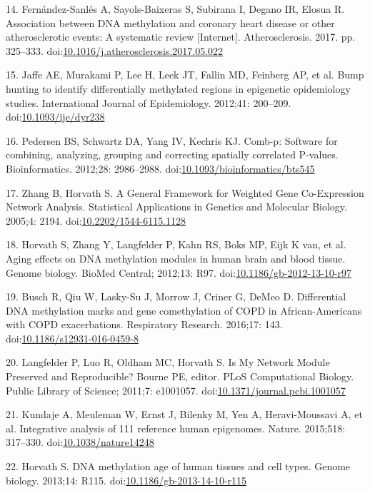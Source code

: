 \documentclass[]{article}
\theoremstyle{definition}
\theoremstyle{definition}
\theoremstyle{definition}
\theoremstyle{remark}
\begin{document}
14. Fern{á}ndez-Sanl{é}s A, Sayols-Baixeras S, Subirana I, Degano IR,
Elosua R. Association between DNA methylation and coronary heart disease
or other atherosclerotic events: A systematic review {[}Internet{]}.
Atherosclerosis. 2017. pp. 325--333.
doi:\href{http://dx.doi.org/10.1016/j.atherosclerosis.2017.05.022}{10.1016/j.atherosclerosis.2017.05.022}

15. Jaffe AE, Murakami P, Lee H, Leek JT, Fallin MD, Feinberg AP, et al.
Bump hunting to identify differentially methylated regions in epigenetic
epidemiology studies. International Journal of Epidemiology. 2012;41:
200--209.
doi:\href{http://dx.doi.org/10.1093/ije/dyr238}{10.1093/ije/dyr238}

16. Pedersen BS, Schwartz DA, Yang IV, Kechris KJ. Comb-p: Software for
combining, analyzing, grouping and correcting spatially correlated
P-values. Bioinformatics. 2012;28: 2986--2988.
doi:\href{http://dx.doi.org/10.1093/bioinformatics/bts545}{10.1093/bioinformatics/bts545}

17. Zhang B, Horvath S. A General Framework for Weighted Gene
Co-Expression Network Analysis. Statistical Applications in Genetics and
Molecular Biology. 2005;4: 2194.
doi:\href{http://dx.doi.org/10.2202/1544-6115.1128}{10.2202/1544-6115.1128}

18. Horvath S, Zhang Y, Langfelder P, Kahn RS, Boks MP, Eijk K van, et
al. Aging effects on DNA methylation modules in human brain and blood
tissue. Genome biology. BioMed Central; 2012;13: R97.
doi:\href{http://dx.doi.org/10.1186/gb-2012-13-10-r97}{10.1186/gb-2012-13-10-r97}

19. Busch R, Qiu W, Lasky-Su J, Morrow J, Criner G, DeMeo D.
Differential DNA methylation marks and gene comethylation of COPD in
African-Americans with COPD exacerbations. Respiratory Research.
2016;17: 143.
doi:\href{http://dx.doi.org/10.1186/s12931-016-0459-8}{10.1186/s12931-016-0459-8}

20. Langfelder P, Luo R, Oldham MC, Horvath S. Is My Network Module
Preserved and Reproducible? Bourne PE, editor. PLoS Computational
Biology. Public Library of Science; 2011;7: e1001057.
doi:\href{http://dx.doi.org/10.1371/journal.pcbi.1001057}{10.1371/journal.pcbi.1001057}

21. Kundaje A, Meuleman W, Ernst J, Bilenky M, Yen A, Heravi-Moussavi A,
et al. Integrative analysis of 111 reference human epigenomes. Nature.
2015;518: 317--330.
doi:\href{http://dx.doi.org/10.1038/nature14248}{10.1038/nature14248}

22. Horvath S. DNA methylation age of human tissues and cell types.
Genome biology. 2013;14: R115.
doi:\href{http://dx.doi.org/10.1186/gb-2013-14-10-r115}{10.1186/gb-2013-14-10-r115}
\end{document}
